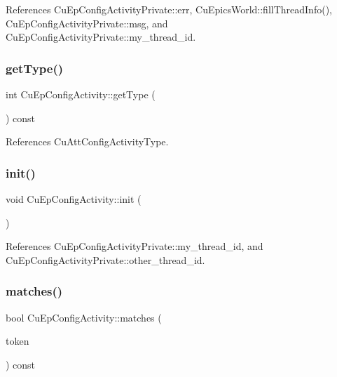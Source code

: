References Cu\+Ep\+Config\+Activity\+Private\+::err, Cu\+Epics\+World\+::fill\+Thread\+Info(), Cu\+Ep\+Config\+Activity\+Private\+::msg, and Cu\+Ep\+Config\+Activity\+Private\+::my\+\_\+thread\+\_\+id.

\mbox{\label{classCuEpConfigActivity_ae92b93cb2a17303daf9eb7d4702c43b8}} 
\subsubsection{get\+Type()}
{\footnotesize\ttfamily int Cu\+Ep\+Config\+Activity\+::get\+Type (\begin{DoxyParamCaption}{ }\end{DoxyParamCaption}) const}



References Cu\+Att\+Config\+Activity\+Type.

\mbox{\label{classCuEpConfigActivity_a2ce6d85ed44cb4bafaca0ea1341a50a8}} 
\subsubsection{init()}
{\footnotesize\ttfamily void Cu\+Ep\+Config\+Activity\+::init (\begin{DoxyParamCaption}{ }\end{DoxyParamCaption})\hspace{0.3cm}{\ttfamily [protected]}}



References Cu\+Ep\+Config\+Activity\+Private\+::my\+\_\+thread\+\_\+id, and Cu\+Ep\+Config\+Activity\+Private\+::other\+\_\+thread\+\_\+id.

\mbox{\label{classCuEpConfigActivity_aeba28440d3334d01a17c2968f1dd8271}} 
\subsubsection{matches()}
{\footnotesize\ttfamily bool Cu\+Ep\+Config\+Activity\+::matches (\begin{DoxyParamCaption}\item[{const Cu\+Data \&}]{token }\end{DoxyParamCaption}) const}

